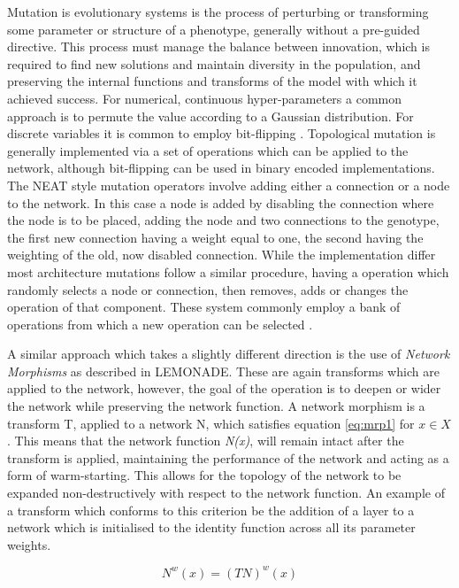 \documentclass{article}
\begin{document}
		Mutation is evolutionary systems is the process of perturbing or transforming some parameter or structure of a phenotype, generally without a pre-guided directive. This process must manage the balance between innovation, which is required to find new solutions and maintain diversity in the population, and preserving the internal functions and transforms of the model with which it achieved success. For numerical, continuous hyper-parameters a common approach is to permute the value according to a Gaussian distribution. For discrete variables it is common to employ bit-flipping \cite{25,39}. Topological mutation is generally implemented via a set of operations which can be applied to the network, although bit-flipping can be used in binary encoded implementations\cite{5}. The NEAT style mutation operators involve adding either a connection or a node to the network. In this case a node is added by disabling the connection where the node is to be placed, adding the node and two connections to the genotype, the first new connection having a weight equal to one, the second having the weighting of the old, now disabled connection. While the implementation differ most architecture mutations follow a similar procedure, having a operation which randomly selects a node or connection, then removes, adds or changes the operation of that component. These system commonly employ a bank of operations from which a new operation can be selected \cite{42,4}.
		\par
		A similar approach which takes a slightly different direction is the use of \textit{Network Morphisms} as described in LEMONADE. These are again transforms which are applied to the network, however, the goal of the operation is to deepen or wider the network while preserving the network function. A network morphism is a transform T, applied to a network N, which satisfies equation \ref{eq:mrp1} for \(x \in X\). This means that the network function \textit{N(x)}, will remain intact after the transform is applied, maintaining the performance of the network and acting as a form of warm-starting. This allows for the topology of the network to be expanded non-destructively with respect to the network function. An example of a transform which conforms to this criterion be the addition of a layer to a network which is initialised to the identity function across all its parameter weights.
	
		\begin{equation}\label{eq:mrp1}
			N^w(x) = (TN)^w(x)
		\end{equation}
\end{document}
